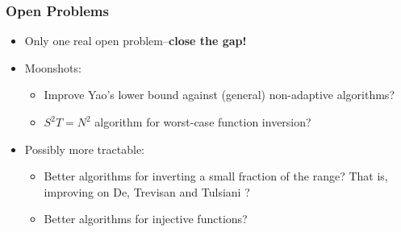 \documentclass[usenames, dvipsnames, t, table]{beamer}
\begin{document}



      \begin{frame}
        \frametitle{Open Problems}
        \begin{itemize}
        \item Only one real open problem--\pause\textbf{close the gap!}
          \pause
        \item Moonshots:
        \begin{itemize}
         \item Improve Yao's lower bound against (general) non-adaptive algorithms?
          \pause
        \item $S^2 T = N^2$ algorithm for worst-case function inversion?
          \pause
        \end{itemize}
        \item Possibly more tractable:
\begin{itemize}
        \item Better algorithms for inverting a small fraction of the range? That is, improving on De, Trevisan and Tulsiani \cite{DTT10}?
          \pause
        \item Better algorithms for injective functions?
\end{itemize}
        \end{itemize}
      \end{frame}
\end{document}
